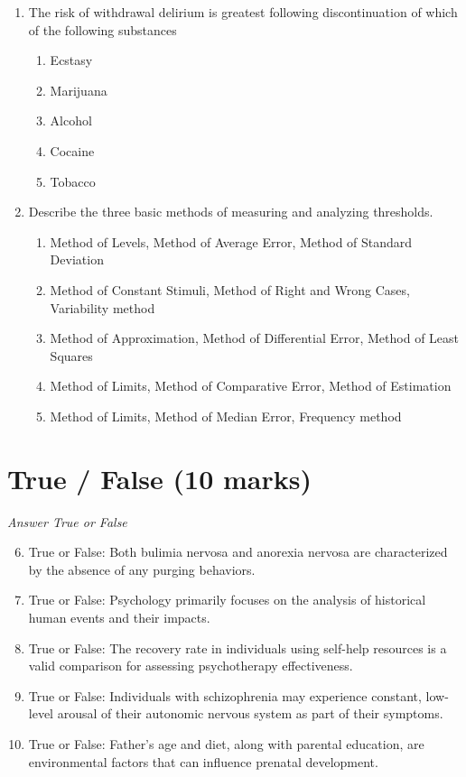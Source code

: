 \documentclass[12pt]{article}
\begin{document}
\begin{enumerate}[label=\arabic*.]
\item The risk of withdrawal delirium is greatest following discontinuation of which of the following substances
\begin{enumerate}[label=(\alph*)]
    \item Ecstasy
    \item Marijuana
    \item Alcohol
    \item Cocaine
    \item Tobacco
\end{enumerate}
\item Describe the three basic methods of measuring and analyzing thresholds.
\begin{enumerate}[label=(\alph*)]
    \item Method of Levels, Method of Average Error, Method of Standard Deviation
    \item Method of Constant Stimuli, Method of Right and Wrong Cases, Variability method
    \item Method of Approximation, Method of Differential Error, Method of Least Squares
    \item Method of Limits, Method of Comparative Error, Method of Estimation
    \item Method of Limits, Method of Median Error, Frequency method
\end{enumerate}
\end{enumerate}

\section*{True / False (10 marks)}
\textit{Answer True or False}
\begin{enumerate}[label=\arabic*.]
\setcounter{enumi}{5}
\item True or False: Both bulimia nervosa and anorexia nervosa are characterized by the absence of any purging behaviors.
\item True or False: Psychology primarily focuses on the analysis of historical human events and their impacts.
\item True or False: The recovery rate in individuals using self-help resources is a valid comparison for assessing psychotherapy effectiveness.
\item True or False: Individuals with schizophrenia may experience constant, low-level arousal of their autonomic nervous system as part of their symptoms.
\item True or False: Father's age and diet, along with parental education, are environmental factors that can influence prenatal development.
\end{enumerate}
\end{document}
